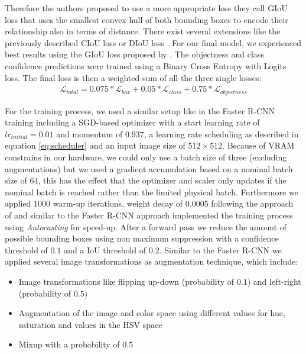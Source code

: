 Therefore the authors proposed to use a more appropriate loss they call \ac{GIoU} loss that uses the smallest convex hull of both bounding boxes to encode their relationship also in terms of distance. There exist several extensions like the previously described \ac{CIoU} loss \autocite{zheng_enhancing_2021} or \ac{DIoU} loss \autocite{DIoU}. For our final model, we experienced best results using the \ac{GIoU} loss proposed by \citeauthor{giou}.
The objectness and class confidence predictions were trained using a Binary Cross Entropy with Logits loss. The final loss is then a weighted sum of all the three single losses:
\begin{align}
	\mathcal{L}_{total} = 0.075 * \mathcal{L}_{box} + 0.05 * \mathcal{L}_{class} + 0.75* \mathcal{L}_{objectness}
\end{align} 

For the training process, we used a similar setup like in the Faster \ac{R-CNN} training including a \ac{SGD}-based optimizer with a start learning rate of $lr_{initial} = 0.01$ and momentum of $0.937$, a learning rate scheduling as described in equation \ref{eq:scheduler} and an input image size of $512 \times 512$. Because of VRAM constrains in our hardware, we could only use a batch size of three (excluding augmentations) but we used a gradient accumulation based on a nominal batch size of $64$, this has the effect that the optimizer and scaler only updates if the nominal batch is reached rather than the limited physical batch.
Furthermore we applied $1000$ warm-up iterations, weight decay of 0.0005 following the approach of \autocite{yolov5} and similar to the Faster \ac{R-CNN} approach implemented the training process using \textit{Autocasting} for speed-up. After a forward pass we reduce the amount of possible bounding boxes using non maximum suppression with a confidence threshold of $0.1$ and a \ac{IoU} threshold of $0.2$.
Similar to the Faster \ac{R-CNN} we applied several image transformations as augmentation technique, which include:
\begin{itemize}
	\item Image transformations like flipping up-down (probability of $0.1$) and left-right (probability of $0.5$)
	\item Augmentation of the image and color space using different values for hue, saturation and values in the HSV space
	\item Mixup \autocite{zhang2017mixup} with a probability of $0.5$
\end{itemize}

